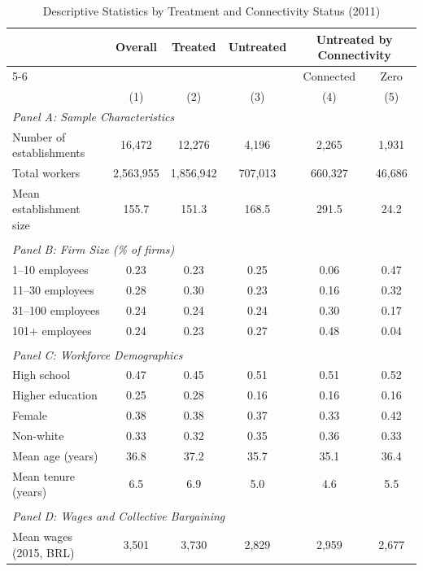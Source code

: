 \begin{table}[H]
\centering
\caption{Descriptive Statistics by Treatment and Connectivity Status (2011)}
\label{tab:descriptive_stats_2011}
\scriptsize
\begin{threeparttable}
\begin{tabular}{lccccc}
\toprule\toprule
 & \multicolumn{1}{c}{Overall} & \multicolumn{1}{c}{Treated} & \multicolumn{1}{c}{Untreated} & \multicolumn{2}{c}{Untreated by Connectivity} \\
 \cmidrule(lr){5-6}
 & & & & Connected & Zero \\
 & (1) & (2) & (3) & (4) & (5) \\
\midrule
\multicolumn{6}{l}{\textit{Panel A: Sample Characteristics}} \\[0.5ex]
Number of establishments & 16,472 & 12,276 & 4,196 & 2,265 & 1,931 \\
Total workers & 2,563,955 & 1,856,942 & 707,013 & 660,327 & 46,686 \\
Mean establishment size & 155.7 & 151.3 & 168.5 & 291.5 & 24.2 \\
&&&&& \\
\multicolumn{6}{l}{\textit{Panel B: Firm Size (\% of firms)}} \\[0.5ex]
1--10 employees & 0.23 & 0.23 & 0.25 & 0.06 & 0.47 \\
11--30 employees & 0.28 & 0.30 & 0.23 & 0.16 & 0.32 \\
31--100 employees & 0.24 & 0.24 & 0.24 & 0.30 & 0.17 \\
101+ employees & 0.24 & 0.23 & 0.27 & 0.48 & 0.04 \\
&&&&& \\
\multicolumn{6}{l}{\textit{Panel C: Workforce Demographics}} \\[0.5ex]
High school & 0.47 & 0.45 & 0.51 & 0.51 & 0.52 \\
Higher education & 0.25 & 0.28 & 0.16 & 0.16 & 0.16 \\
Female & 0.38 & 0.38 & 0.37 & 0.33 & 0.42 \\
Non-white & 0.33 & 0.32 & 0.35 & 0.36 & 0.33 \\
Mean age (years) & 36.8 & 37.2 & 35.7 & 35.1 & 36.4 \\
Mean tenure (years) & 6.5 & 6.9 & 5.0 & 4.6 & 5.5 \\
&&&&& \\
\multicolumn{6}{l}{\textit{Panel D: Wages and Collective Bargaining}} \\[0.5ex]
Mean wages (2015, BRL) & 3,501 & 3,730 & 2,829 & 2,959 & 2,677 \\

\end{tabular}
\end{threeparttable}
\end{table}

